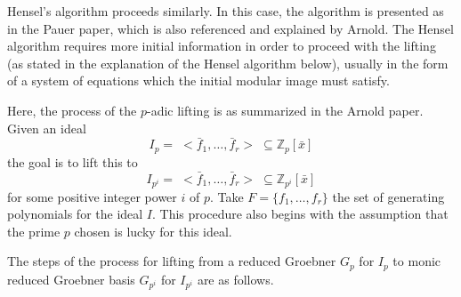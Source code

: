 \documentclass[letterpaper,12pt,titlepage,oneside,final]{book}
\begin{document}
Hensel's algorithm proceeds similarly.  In this case, the algorithm is presented as in the Pauer paper, which is also referenced and explained by Arnold.  The Hensel algorithm requires more initial information in order to proceed with the lifting (as stated in the explanation of the Hensel algorithm below), usually in the form of a system of equations which the initial modular image must satisfy.  

Here, the process of the ${p}$-adic lifting is as summarized in the Arnold paper.  Given an ideal \begin{equation*}I_{p} = \; <\bar f_1, \ldots, \bar f_r> \; \subseteq \mathbb{Z}_{p}[\bar x]\end{equation*}the goal is to lift this to \begin{equation*}I_{p^i} = \; <\bar f_1, \ldots, \bar f_r> \; \subseteq \mathbb{Z}_{p^i}[\bar x]\end{equation*}for some positive integer power ${i}$ of ${p}$.  Take ${F = \{f_1, \ldots, f_r\}}$ the set of generating polynomials for the ideal ${I}$.  This procedure also begins with the assumption that the prime ${p}$ chosen is lucky for this ideal.

The steps of the process for lifting from a reduced Groebner ${G_p}$ for ${I_p}$ to monic reduced Groebner basis ${G_{p^i}}$ for ${I_{p^i}}$ are as follows.
\end{document}
